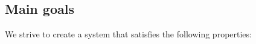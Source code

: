 




















\newpage

\subsection{Main goals}

We strive to create a system that satisfies the following properties:

